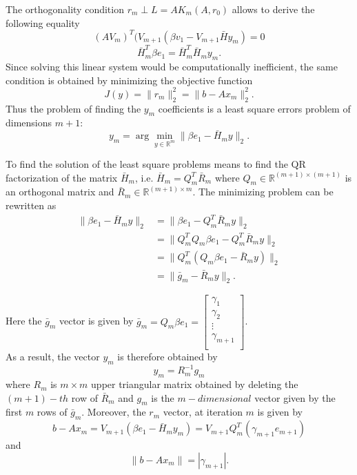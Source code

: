 The orthogonality condition $r_m \perp \mathit{L}=A\mathit{K}_m(A,r_0)$ allows to derive the following equality  
\begin{equation}
    (AV_m)^T(V_{m+1}(\beta v_1 - V_{m+1}\bar{H} y_m) = 0
\end{equation}
\begin{equation}
    \bar{H}_m^T \beta e_1 = \bar{H}_m^T \bar{H}_m y_m. 
\end{equation}
Since solving this linear system would be computationally inefficient, the same condition is obtained by minimizing the objective function $$J(y) = \|r_m\|_2^2 = \|b - Ax_m\|_2^2.$$ Thus the problem of finding the $y_m$ coefficients is a least square errors problem of dimensions $m+1$: \begin{equation}
    y_m = \arg\min_{y \in \mathbb{R}^m} \|\beta e_1 - \bar{H}_m y\|_2.
\end{equation}

To find the solution of the least square problems means to find the QR factorization of the matrix $\bar{H}_m$, i.e. $\bar{H}_m = Q_m^T \bar{R}_m$ where $Q_m \in \mathbb{R}^{(m+1) \times (m+1) }$ is an orthogonal matrix and $\bar{R}_m  \in \mathbb{R}^{(m+1) \times m} $. The minimizing problem can be rewritten as 
\begin{equation}\label{eq:leastsquaresolver}
\begin{aligned}
    \|\beta e_1 - \bar{H}_m y\|_2 &= \|\beta e_1 - Q_m^T \bar{R}_m y\|_2 \\
    &= \|Q_m^T Q_m \beta e_1 - Q_m^T \bar{R}_m y\|_2 \\
    &= \|Q_m^T (Q_m \beta e_1 - \bar{R}_m y)\|_2 \\
    &= \|\bar{g}_m - \bar{R}_m y\|_2.
\end{aligned}
\end{equation}

\noindent Here the $\bar{g}_m$ vector is given by $\bar{g}_m = Q_m\beta e_1 = \begin{bmatrix}
\gamma_1 \\
\gamma_2 \\
\vdots \\
\gamma_{m+1} \\
\end{bmatrix} $.\\

\noindent As a result, the vector $y_m$ is therefore obtained by \begin{equation}
    y_m = R_m^{-1} g_m
\end{equation}
where $R_m$ is $m \times m$ upper triangular matrix obtained by deleting the $(m+1)-th$ row of $\bar{R}_m$ and $g_m$ is the $m-dimensional$ vector given by the first $m$ rows of $\bar{g}_m$. Moreover, the $r_m$ vector, at iteration $m$ is given by $$b - Ax_m = V_{m+1}(\beta e_1 - \bar{H}_my_m)= V_{m+1}Q_m^T(\gamma_{m+1} e_{m+1} ) 
$$ and $$\|b - Ax_m \| = |\gamma_{m+1}|. $$
